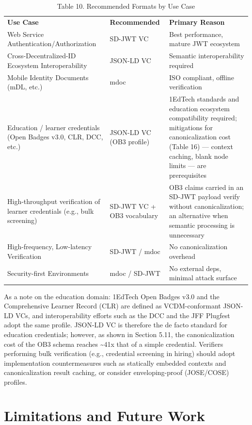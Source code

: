 \documentclass[conference]{IEEEtran}
\begin{document}
\begin{table}[!t]
\centering
\caption{Table 10. Recommended Formats by Use Case}\label{tab:10}
\footnotesize
\begin{tabular}{>{\raggedright\arraybackslash}p{}l>{\raggedright\arraybackslash}p{}}
\toprule

\textbf{Use Case} & \textbf{Recommended} & \textbf{Primary Reason}\tabularnewline
Web Service Authentication/Authorization & SD-JWT VC & Best performance, mature JWT ecosystem\tabularnewline
Cross-Decentralized-ID Ecosystem Interoperability & JSON-LD VC & Semantic interoperability required\tabularnewline
Mobile Identity Documents (mDL, etc.) & mdoc & ISO compliant, offline verification\tabularnewline
Education / learner credentials (Open Badges v3.0, CLR, DCC, etc.) & JSON-LD VC (OB3 profile) & 1EdTech standards and education ecosystem compatibility required; mitigations for canonicalization cost (Table 16) --- context caching, blank node limits --- are prerequisites\tabularnewline
High-throughput verification of learner credentials (e.g., bulk screening) & SD-JWT VC + OB3 vocabulary & OB3 claims carried in an SD-JWT payload verify without canonicalization; an alternative when semantic processing is unnecessary\tabularnewline
High-frequency, Low-latency Verification & SD-JWT / mdoc & No canonicalization overhead\tabularnewline
Security-first Environments & mdoc / SD-JWT & No external deps, minimal attack surface\tabularnewline
\bottomrule
\end{tabular}
\end{table}

As a note on the education domain: 1EdTech Open Badges v3.0 \cite{ref19} and the Comprehensive Learner Record (CLR) are defined as VCDM-conformant JSON-LD VCs, and interoperability efforts such as the DCC \cite{ref20} and the JFF Plugfest adopt the same profile. JSON-LD VC is therefore the de facto standard for education credentials; however, as shown in Section 5.11, the canonicalization cost of the OB3 schema reaches \textasciitilde41x that of a simple credential. Verifiers performing bulk verification (e.g., credential screening in hiring) should adopt implementation countermeasures such as statically embedded contexts and canonicalization result caching, or consider enveloping-proof (JOSE/COSE) profiles.

\section{Limitations and Future Work}
\end{document}
